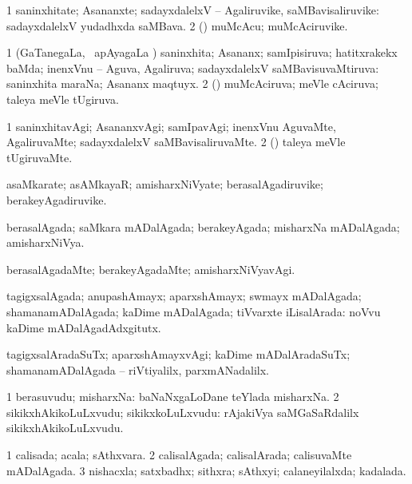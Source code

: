 \bentry
{}
\gl{\nA}
\bmng
\bnum
\num{1} saninxhitate; Asananxte; sadayxdalelxV -- Agaliruvike, saMBavisaliruvike:  sadayxdalelxV yudadhxda saMBava. 
\num{2} (\pArxparx) muMcAcu; muMcAciruvike. 
\enum
\emng
\eentry

\bentry
{}
\gl{\gu}
\bmng
\bnum
\num{1} (GaTanegaLa, \kanmu\ apAyagaLa \vi) saninxhita; Asananx; samIpisiruva; hatitxrakekx baMda; inenxVnu -- Aguva, Agaliruva; sadayxdalelxV saMBavisuvaMtiruva:  saninxhita maraNa; Asananx maqtuyx. 
\num{2} (\pArxparx) muMcAciruva; meVle cAciruva; taleya meVle tUgiruva. 
\enum
\emng
\eentry

\bentry
{}
\gl{\kirxvi}
\bmng
\bnum
\num{1} saninxhitavAgi; AsananxvAgi; samIpavAgi; inenxVnu AguvaMte, AgaliruvaMte; sadayxdalelxV saMBavisaliruvaMte. 
\num{2} (\pArxparx) taleya meVle tUgiruvaMte. 
\enum
\emng
\eentry

\bentry
{}
\gl{\nA}
\bmng
asaMkarate; asAMkayaR; amisharxNiVyate; berasalAgadiruvike; berakeyAgadiruvike. 
\emng
\eentry

\bentry
{}
\gl{\gu}
\bmng
berasalAgada; saMkara mADalAgada; berakeyAgada; misharxNa mADalAgada; amisharxNiVya. 
\emng
\eentry

\bentry
{}
\gl{\kirxvi}
\bmng
berasalAgadaMte; berakeyAgadaMte; amisharxNiVyavAgi. 
\emng
\eentry

\bentry
{}
\gl{\gu}
\bmng
tagigxsalAgada; anupashAmayx; aparxshAmayx; swmayx mADalAgada; shamanamADalAgada; kaDime mADalAgada; tiVvarxte iLisalArada:  noVvu kaDime mADalAgadAdxgitutx. 
\emng
\eentry

\bentry
{}
\gl{\kirxvi}
\bmng
tagigxsalAradaSuTx; aparxshAmayxvAgi; kaDime mADalAradaSuTx; shamanamADalAgada -- riVtiyalilx, parxmANadalilx. 
\emng
\eentry

\bentry
{}
\gl{\nA}
\bmng
\bnum
\num{1} berasuvudu; misharxNa:  baNaNxgaLoDane teYlada misharxNa. 
\num{2} sikikxhAkikoLuLxvudu; sikikxkoLuLxvudu:  rAjakiVya saMGaSaRdalilx sikikxhAkikoLuLxvudu. 
\enum
\emng
\eentry

\bentry
{}
\gl{\gu}
\bmng
\bnum
\num{1} calisada; acala; sAthxvara. 
\num{2} calisalAgada; calisalArada; calisuvaMte mADalAgada. 
\num{3} nishacxla; satxbadhx; sithxra; sAthxyi; calaneyilalxda; kadalada. 
\enum
\emng
\eentry

